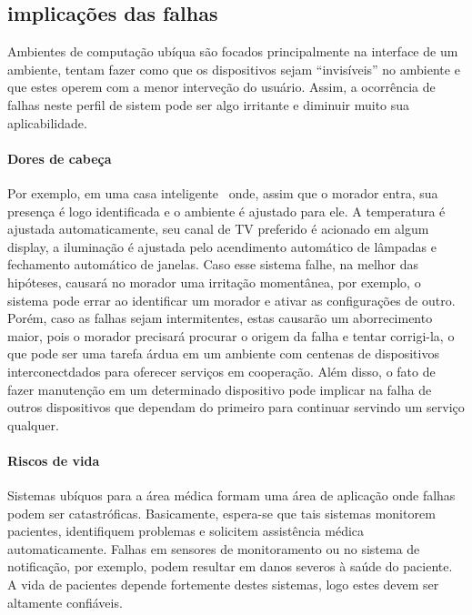 
\subsection{implicações das falhas} %
\label{sub:implicacoes_das_falhas}

Ambientes de computação ubíqua são focados principalmente na interface de um ambiente, tentam fazer como que os dispositivos sejam ``invisíveis'' no ambiente e que estes operem com a menor interveção do usuário. Assim, a ocorrência de falhas neste perfil de sistem pode ser algo irritante e diminuir muito sua aplicabilidade.

\paragraph{Dores de cabeça}

Por exemplo, em uma casa inteligente~\cite{Kidd99} onde, assim que o morador entra, sua presença é logo identificada e o ambiente é ajustado para ele. A temperatura é ajustada automaticamente, seu canal de TV preferido é acionado em algum display, a iluminação é ajustada pelo acendimento automático de lâmpadas e fechamento automático de janelas. Caso esse sistema falhe, na melhor das hipóteses, causará no morador uma irritação momentânea, por exemplo, o sistema pode errar ao identificar um morador e ativar as configurações de outro. Porém, caso as falhas sejam intermitentes, estas causarão um aborrecimento maior, pois o morador precisará procurar o origem da falha e tentar corrigi-la, o que pode ser uma tarefa árdua em um ambiente com centenas de dispositivos interconectdados para oferecer serviços em cooperação. Além disso, o fato de fazer manutenção em um determinado dispositivo pode implicar na falha de outros dispositivos que dependam do primeiro para continuar servindo um serviço qualquer.

\paragraph{Riscos de vida}

Sistemas ubíquos para a área médica formam uma área de aplicação onde falhas podem ser catastróficas. Basicamente, espera-se que tais sistemas monitorem pacientes, identifiquem problemas e solicitem assistência médica automaticamente. Falhas em sensores de monitoramento ou no sistema de notificação, por exemplo, podem resultar em danos severos à saúde do paciente. A vida de pacientes depende fortemente destes sistemas, logo estes devem ser altamente confiáveis.

